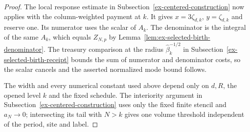 \begin{proof}
The local response estimate in Subsection~\ref{ex-centered-construction}
now applies with the column-weighted payment at $k$. It gives
$x=3\zeta_{d,k}$, $y=\zeta_{d,k}$ and reserve one. Its numerator
uses the scalar of $A_k$. The denominator is the integral of the
same $A_k$, which equals $Z_{N,p}$ by
Lemma~\ref{lem:ex-selected-birth-denominator}. The treasury comparison
at the radius $\widehat\beta_k^{-1/2}$ in
Subsection~\ref{ex-selected-birth-receipt} bounds the sum of numerator
and denominator costs, so the scalar cancels and the asserted
normalized mode bound follows.

The width and every numerical constant used above depend only on
$d,R$, the opened level $k$ and the fixed schedule. The interiority argument in
Subsection~\ref{ex-centered-construction} uses only the fixed finite
stencil and $a_N\to0$; intersecting its tail with $N>k$ gives one
volume threshold independent of the period, site and label.
\end{proof}
